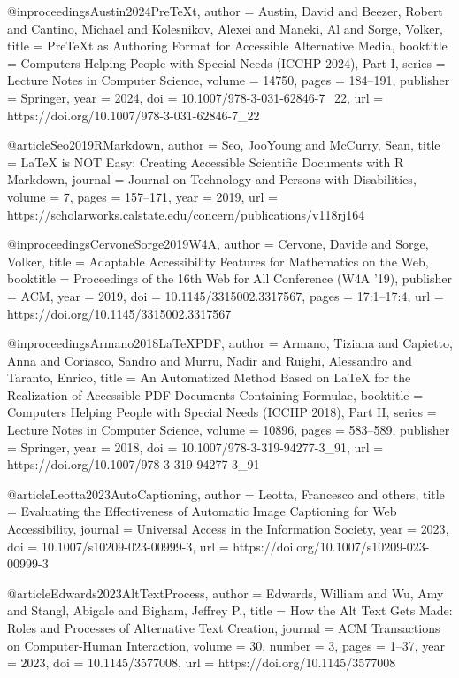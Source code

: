 @inproceedings{Austin2024PreTeXt,
  author    = {Austin, David and Beezer, Robert and Cantino, Michael and Kolesnikov, Alexei and Maneki, Al and Sorge, Volker},
  title     = {PreTeXt as Authoring Format for Accessible Alternative Media},
  booktitle = {Computers Helping People with Special Needs (ICCHP 2024), Part I},
  series    = {Lecture Notes in Computer Science},
  volume    = {14750},
  pages     = {184--191},
  publisher = {Springer},
  year      = {2024},
  doi       = {10.1007/978-3-031-62846-7\_22},
  url       = {https://doi.org/10.1007/978-3-031-62846-7\_22}
}

@article{Seo2019RMarkdown,
  author  = {Seo, JooYoung and McCurry, Sean},
  title   = {LaTeX is NOT Easy: Creating Accessible Scientific Documents with R Markdown},
  journal = {Journal on Technology and Persons with Disabilities},
  volume  = {7},
  pages   = {157--171},
  year    = {2019},
  url     = {https://scholarworks.calstate.edu/concern/publications/v118rj164}
}

@inproceedings{CervoneSorge2019W4A,
  author    = {Cervone, Davide and Sorge, Volker},
  title     = {Adaptable Accessibility Features for Mathematics on the Web},
  booktitle = {Proceedings of the 16th Web for All Conference (W4A '19)},
  publisher = {ACM},
  year      = {2019},
  doi       = {10.1145/3315002.3317567},
  pages     = {17:1--17:4},
  url       = {https://doi.org/10.1145/3315002.3317567}
}

@inproceedings{Armano2018LaTeXPDF,
  author    = {Armano, Tiziana and Capietto, Anna and Coriasco, Sandro and Murru, Nadir and Ruighi, Alessandro and Taranto, Enrico},
  title     = {An Automatized Method Based on LaTeX for the Realization of Accessible PDF Documents Containing Formulae},
  booktitle = {Computers Helping People with Special Needs (ICCHP 2018), Part II},
  series    = {Lecture Notes in Computer Science},
  volume    = {10896},
  pages     = {583--589},
  publisher = {Springer},
  year      = {2018},
  doi       = {10.1007/978-3-319-94277-3\_91},
  url       = {https://doi.org/10.1007/978-3-319-94277-3\_91}
}

@article{Leotta2023AutoCaptioning,
  author  = {Leotta, Francesco and others},
  title   = {Evaluating the Effectiveness of Automatic Image Captioning for Web Accessibility},
  journal = {Universal Access in the Information Society},
  year    = {2023},
  doi     = {10.1007/s10209-023-00999-3},
  url     = {https://doi.org/10.1007/s10209-023-00999-3}
}

@article{Edwards2023AltTextProcess,
  author  = {Edwards, William and Wu, Amy and Stangl, Abigale and Bigham, Jeffrey P.},
  title   = {How the Alt Text Gets Made: Roles and Processes of Alternative Text Creation},
  journal = {ACM Transactions on Computer-Human Interaction},
  volume  = {30},
  number  = {3},
  pages   = {1--37},
  year    = {2023},
  doi     = {10.1145/3577008},
  url     = {https://doi.org/10.1145/3577008}
}

